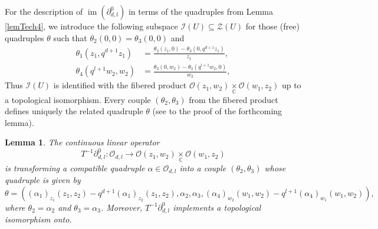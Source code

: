 \documentclass[12pt,reqno]{amsart}%
\theoremstyle{plain}
\newtheorem{lemma}{Lemma}
\numberwithin{theorem}{section} \numberwithin{equation}{section}
\numberwithin{lemma}{section}
\numberwithin{remark}{section}
\numberwithin{example}{section}
\numberwithin{proposition}{section}
\numberwithin{definition}{section}
\numberwithin{corollary}{section}
\begin{document}
For the description of $\operatorname{im}\left(  \partial_{d,l}^{0}\right)  $
in terms of the quadruples from Lemma \ref{lemTech4}, we introduce the
following subspace $\mathcal{I}\left(  U\right)  \subseteq\mathcal{Z}\left(
U\right)  $ for those (free) quadruples $\theta$ such that $\theta_{2}\left(
0,0\right)  =\theta_{3}\left(  0,0\right)  $ and
\begin{align}
\theta_{1}\left(  z_{1},q^{d+1}z_{1}\right)   &  =\frac{\theta_{2}\left(
z_{1},0\right)  -\theta_{3}\left(  0,q^{d+1}z_{1}\right)  }{z_{1}%
},\label{Theta}\\
\theta_{4}\left(  q^{l+1}w_{2},w_{2}\right)   &  =\frac{\theta_{2}\left(
0,w_{2}\right)  -\theta_{3}\left(  q^{l+1}w_{2},0\right)  }{w_{2}},\nonumber
\end{align}
Thus $\mathcal{I}\left(  U\right)  $ is identified with the fibered product
$\mathcal{O}\left(  z_{1},w_{2}\right)  \underset{\mathbb{C}}{\times
}\mathcal{O}\left(  w_{1},z_{2}\right)  $ up to a topological isomorphism.
Every couple $\left(  \theta_{2},\theta_{3}\right)  $ from the fibered product
defines uniquely the related quadruple $\theta$ (see to the proof of the
forthcoming lemma).

\begin{lemma}
\label{lemTech5}The continuous linear operator
\[
T^{-1}\partial_{d,l}^{0}:\mathcal{O}_{d,l}\longrightarrow\mathcal{O}\left(
z_{1},w_{2}\right)  \underset{\mathbb{C}}{\times}\mathcal{O}\left(
w_{1},z_{2}\right)
\]
is transforming a compatible quadruple $\alpha\in\mathcal{O}_{d,l}$ into a
couple $\left(  \theta_{2},\theta_{3}\right)  $ whose quadruple is given by
\[
\theta=\left(  \left(  \alpha_{1}\right)  _{z_{1}}\left(  z_{1},z_{2}\right)
-q^{d+1}\left(  \alpha_{1}\right)  _{z_{2}}\left(  z_{1},z_{2}\right)
,\alpha_{2},\alpha_{3},\left(  \alpha_{4}\right)  _{w_{2}}\left(  w_{1}%
,w_{2}\right)  -q^{l+1}\left(  \alpha_{4}\right)  _{w_{1}}\left(  w_{1}%
,w_{2}\right)  \right)  ,
\]
where $\theta_{2}=\alpha_{2}$ and $\theta_{3}=\alpha_{3}$. Moreover,
$T^{-1}\partial_{d,l}^{0}$ implements a topological isomorphism onto.
\end{lemma}
\end{document}
